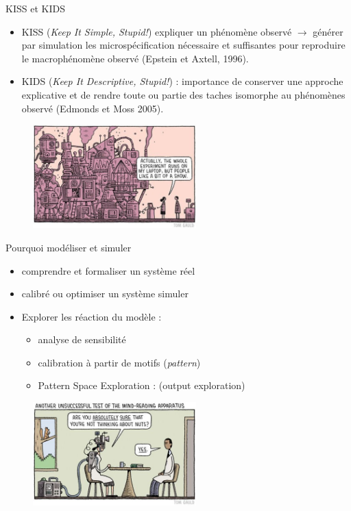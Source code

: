 \documentclass[newPxFont]{beamer}
\begin{document}
\begin{frame}[c]{KISS et KIDS}
  \vspace{-2em}
  \begin{itemize}
    \item KISS (\textit{Keep It Simple, Stupid!}) expliquer un phénomène observé $\rightarrow$ générer par simulation les microspécification nécessaire et suffisantes pour reproduire le macrophénomène observé (Epstein et Axtell, 1996).
    \item KIDS (\textit{Keep It Descriptive, Stupid!}) : importance de conserver une approche explicative et de rendre toute ou partie des taches isomorphe au phénomènes observé (Edmonds et Moss 2005).
  \end{itemize}
  \vspace{-1em}
  \begin{figure}
   \includegraphics[height=4cm]{img/a_KIDS.jpg}
  \end{figure}
\end{frame}

\begin{frame}[c]{Pourquoi modéliser et simuler}
  \vspace{-2em}
  \begin{itemize}
    \item comprendre et formaliser un système réel
    \item calibré ou optimiser un système simuler
    \item Explorer les réaction du modèle :
    \begin{itemize}
      \item analyse de sensibilité
      \item calibration à partir de motifs (\textit{pattern})
      \item Pattern Space Exploration : (output exploration)
    \end{itemize}
  \end{itemize}
  \vspace{-1em}
  \begin{figure}
   \includegraphics[height=4cm]{img/a_gauld_nutts.jpg}
  \end{figure}
\end{frame}
\end{document}
